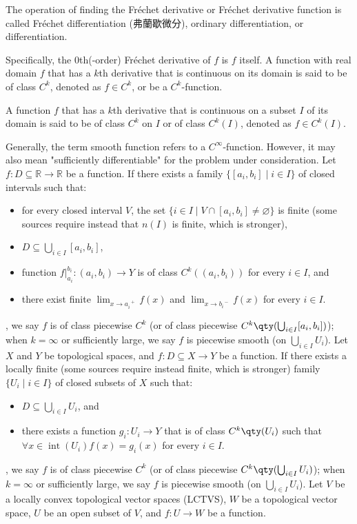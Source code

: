 \documentclass[a4paper,12pt]{report}
\begin{document}
The operation of finding the Fréchet derivative or Fréchet derivative function is called Fréchet differentiation (弗蘭歇微分), ordinary differentiation, or differentiation.

Specifically, the $0$th(-order) Fréchet derivative of $f$ is $f$ itself.
A function with real domain $f$ that has a $k$th derivative that is continuous on its domain is said to be of class $C^k$, denoted as $f\in C^k$, or be a $C^k$-function.

A function $f$ that has a $k$th derivative that is continuous on a subset $I$ of its domain is said to be of class $C^k$ on $I$ or of class $C^k(I)$, denoted as $f\in C^k(I)$.

Generally, the term smooth function refers to a $C^{\infty}$-function. However, it may also mean "sufficiently differentiable" for the problem under consideration.
Let $f\colon D\subseteq\mathbb{R}\to\mathbb{R}$ be a function. If there exists a family $\{[a_i,b_i]\mid i\in I\}$ of closed intervals such that:
\begin{itemize}
\item for every closed interval $V$, the set $\{i\in I\mid V\cap [a_i,b_i]\neq\varnothing\}$ is finite (some sources require instead that $n(I)$ is finite, which is stronger),
\item $D\subseteq\bigcup_{i\in I}[a_i,b_i]$,
\item function $f\big\vert_{a_i}^{b_i}\colon(a_i,b_i)\to Y$ is of class $C^k((a_i,b_i))$ for every $i\in I$, and
\item there exist finite $\lim_{x\to a_i^{\phantom{i}+}}f(x)$ and $\lim_{x\to b_i^{\phantom{i}-}}f(x)$ for every $i\in I$.
\end{itemize},
we say $f$ is of class piecewise $C^k$ (or of class piecewise $C^k\qty(\bigcup_{i\in I}[a_i,b_i])$); when $k=\infty$ or sufficiently large, we say $f$ is piecewise smooth (on $\bigcup_{i\in I}U_i$).
Let $X$ and $Y$ be topological spaces, and $f\colon D\subseteq X\to Y$ be a function. If there exists a locally finite (some sources require instead finite, which is stronger) family $\{U_i\mid i\in I\}$ of closed subsets of $X$ such that:
\begin{itemize}
\item $D\subseteq\bigcup_{i\in I}U_i$, and
\item there exists a function $g_i\colon U_i\to Y$ that is of class $C^k\qty(U_i)$ such that $\forall x\in\operatorname{int}\left(U_i\right)f(x)=g_i(x)$ for every $i\in I$.
\end{itemize},
we say $f$ is of class piecewise $C^k$ (or of class piecewise $C^k\qty(\bigcup_{i\in I}U_i)$); when $k=\infty$ or sufficiently large, we say $f$ is piecewise smooth (on $\bigcup_{i\in I}U_i$).
Let $V$ be a locally convex topological vector spaces (LCTVS), $W$ be a topological vector space, $U$ be an open subset of $V$, and $f\colon U\to W$ be a function.
\end{document}
